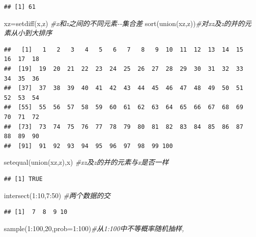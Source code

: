 \documentclass[
]{book}
\newenvironment{Shaded}{\begin{snugshade}}{\end{snugshade}}
\newcommand{\AttributeTok}[1]{\textcolor[rgb]{0.77,0.63,0.00}{#1}}
\newcommand{\CommentTok}[1]{\textcolor[rgb]{0.56,0.35,0.01}{\textit{#1}}}
\newcommand{\DecValTok}[1]{\textcolor[rgb]{0.00,0.00,0.81}{#1}}
\newcommand{\FunctionTok}[1]{\textcolor[rgb]{0.00,0.00,0.00}{#1}}
\newcommand{\NormalTok}[1]{#1}
\newcommand{\OtherTok}[1]{\textcolor[rgb]{0.56,0.35,0.01}{#1}}
\newcommand{\SpecialCharTok}[1]{\textcolor[rgb]{0.00,0.00,0.00}{#1}}
\begin{document}
\begin{verbatim}
## [1] 61
\end{verbatim}

\begin{Shaded}
\begin{Highlighting}[]
\NormalTok{xz}\OtherTok{=}\FunctionTok{setdiff}\NormalTok{(x,z) }\CommentTok{\#x和z之间的不同元素{-}{-}集合差}
\FunctionTok{sort}\NormalTok{(}\FunctionTok{union}\NormalTok{(xz,z))}\CommentTok{\#对xz及z的并的元素从小到大排序}
\end{Highlighting}
\end{Shaded}

\begin{verbatim}
##   [1]   1   2   3   4   5   6   7   8   9  10  11  12  13  14  15  16  17  18
##  [19]  19  20  21  22  23  24  25  26  27  28  29  30  31  32  33  34  35  36
##  [37]  37  38  39  40  41  42  43  44  45  46  47  48  49  50  51  52  53  54
##  [55]  55  56  57  58  59  60  61  62  63  64  65  66  67  68  69  70  71  72
##  [73]  73  74  75  76  77  78  79  80  81  82  83  84  85  86  87  88  89  90
##  [91]  91  92  93  94  95  96  97  98  99 100
\end{verbatim}

\begin{Shaded}
\begin{Highlighting}[]
\FunctionTok{setequal}\NormalTok{(}\FunctionTok{union}\NormalTok{(xz,z),x) }\CommentTok{\#xz及z的并的元素与x是否一样}
\end{Highlighting}
\end{Shaded}

\begin{verbatim}
## [1] TRUE
\end{verbatim}

\begin{Shaded}
\begin{Highlighting}[]
\FunctionTok{intersect}\NormalTok{(}\DecValTok{1}\SpecialCharTok{:}\DecValTok{10}\NormalTok{,}\DecValTok{7}\SpecialCharTok{:}\DecValTok{50}\NormalTok{) }\CommentTok{\#两个数据的交}
\end{Highlighting}
\end{Shaded}

\begin{verbatim}
## [1]  7  8  9 10
\end{verbatim}

\begin{Shaded}
\begin{Highlighting}[]
\FunctionTok{sample}\NormalTok{(}\DecValTok{1}\SpecialCharTok{:}\DecValTok{100}\NormalTok{,}\DecValTok{20}\NormalTok{,}\AttributeTok{prob=}\DecValTok{1}\SpecialCharTok{:}\DecValTok{100}\NormalTok{)}\CommentTok{\#从1:100中不等概率随机抽样,}
\end{Highlighting}
\end{Shaded}
\end{document}
